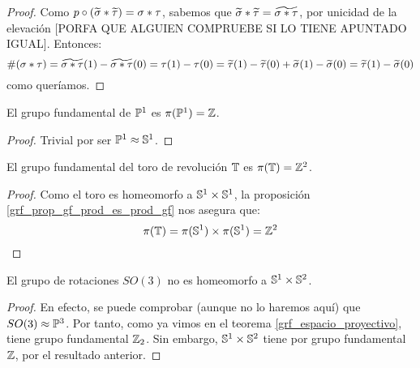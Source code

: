 \begin{theo}
\begin{proof}
Como $p\circ(\widetilde{\sigma}\mathbin{*}\widetilde{\tau}) = \sigma\mathbin{*}\tau$, sabemos que $\widetilde{\sigma}\mathbin{*}\widetilde{\tau} = \widetilde{\sigma\mathbin{*}\tau}$, por unicidad de la elevación [PORFA QUE ALGUIEN COMPRUEBE SI LO TIENE APUNTADO IGUAL]. Entonces:
\[\mathrm{\#}(\sigma\mathbin{*}\tau)=\widetilde{\sigma\mathbin{*}\tau}(1)-\widetilde{\sigma\mathbin{*}\tau}(0)=\tau(1)-\tau(0)=\widetilde{\tau}(1)-\widetilde{\tau}(0) + \widetilde{\sigma}(1)-\widetilde{\sigma}(0)=\widetilde{\tau}(1) - \widetilde{\sigma}(0)\]
como queríamos.
\end{proof}
\end{theo}

\begin{cor}
El grupo fundamental de  $\mathbb{P}^1$ es $\pi(\mathbb{P}^1)=\mathbb{Z}$.

\begin{proof}
Trivial por ser $\mathbb{P}^1\approx\mathbb{S}^1$. 
\end{proof}
\end{cor}

\begin{cor}
El grupo fundamental del toro de revolución $\mathbb{T}$ es $\pi(\mathbb{T})=\mathbb{Z}^2$.

\begin{proof}
Como el toro  es homeomorfo a $\mathbb{S}^1\times\mathbb{S}^1$, la proposición \ref{grf_prop_gf_prod_es_prod_gf} nos asegura que:
\[\pi(\mathbb{T})=\pi(\mathbb{S}^1)\times\pi(\mathbb{S}^1)=\mathbb{Z}^2\]
\end{proof}
\end{cor}

\begin{cor}
El grupo de rotaciones  $SO(3)$ no es homeomorfo a $\mathbb{S}^1\times\mathbb{S}^2$.

\begin{proof}
En efecto, se puede comprobar (aunque no lo haremos aquí) que $SO(3)\approx\mathbb{P}^3$. Por tanto, como ya vimos en el teorema \ref{grf_espacio_proyectivo}, tiene grupo fundamental $\mathbb{Z}_2$. Sin embargo, $\mathbb{S}^1\times\mathbb{S}^2$ tiene por grupo fundamental $\mathbb{Z}$, por el resultado anterior.
\end{proof}
\end{cor}